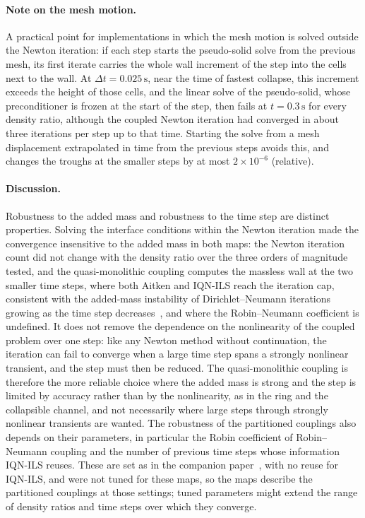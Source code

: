 \paragraph{Note on the mesh motion.}\label{sec:robustness_collapsible_mesh}
A practical point for implementations in which the mesh motion is solved outside the Newton iteration: if each step starts the pseudo-solid solve from the previous mesh, its first iterate carries the whole wall increment of the step into the cells next to the wall.
At $\Delta t = 0.025\,\mathrm{s}$, near the time of fastest collapse, this increment exceeds the height of those cells, and the linear solve of the pseudo-solid, whose preconditioner is frozen at the start of the step, then fails at $t = 0.3\,\mathrm{s}$ for every density ratio, although the coupled Newton iteration had converged in about three iterations per step up to that time.
Starting the solve from a mesh displacement extrapolated in time from the previous steps avoids this, and changes the troughs at the smaller steps by at most $2\times10^{-6}$ (relative).

\paragraph{Discussion.}
Robustness to the added mass and robustness to the time step are distinct properties.
Solving the interface conditions within the Newton iteration made the convergence insensitive to the added mass in both maps: the Newton iteration count did not change with the density ratio over the three orders of magnitude tested, and the quasi-monolithic coupling computes the massless wall at the two smaller time steps, where both Aitken and IQN-ILS reach the iteration cap, consistent with the added-mass instability of Dirichlet--Neumann iterations growing as the time step decreases~\citep{Causin2005}, and where the Robin--Neumann coefficient is undefined.
It does not remove the dependence on the nonlinearity of the coupled problem over one step: like any Newton method without continuation, the iteration can fail to converge when a large time step spans a strongly nonlinear transient, and the step must then be reduced.
The quasi-monolithic coupling is therefore the more reliable choice where the added mass is strong and the step is limited by accuracy rather than by the nonlinearity, as in the ring and the collapsible channel, and not necessarily where large steps through strongly nonlinear transients are wanted.
The robustness of the partitioned couplings also depends on their parameters, in particular the Robin coefficient of Robin--Neumann coupling and the number of previous time steps whose information IQN-ILS reuses.
These are set as in the companion paper~\citep{CardiffFSIVerification2026}, with no reuse for IQN-ILS, and were not tuned for these maps, so the maps describe the partitioned couplings at those settings; tuned parameters might extend the range of density ratios and time steps over which they converge.
